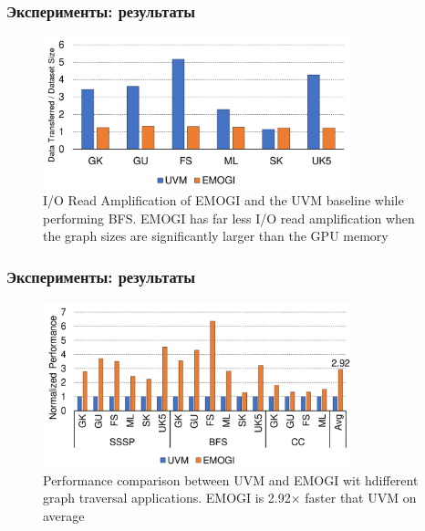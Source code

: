 \documentclass[xcolor=table,english]{beamer}
\begin{document}
\begin{frame}[fragile] \frametitle{Эксперименты: результаты}
     \begin{center}
    \begin{minipage}[m]{0.95\linewidth}
        \begin{figure}
            \centering
            \includegraphics[width=0.8\textwidth]{figures/transfered_data.png}
            \caption{I/O Read Amplification of EMOGI and the UVM baseline while performing BFS. EMOGI has far less I/O read amplification when the graph sizes are significantly larger than the GPU memory}
        \end{figure}
    \end{minipage}\hfill
    \end{center}
\end{frame}

\begin{frame}[fragile] \frametitle{Эксперименты: результаты}
     \begin{center}
    \begin{minipage}[m]{0.95\linewidth}
        \begin{figure}
            \centering
            \includegraphics[width=0.8\textwidth]{figures/overall_performance.png}
            \caption{Performance comparison between UVM and EMOGI wit hdifferent graph traversal applications. EMOGI is 2.92× faster that UVM on average}
        \end{figure}
    \end{minipage}\hfill
    \end{center}
\end{frame}
\end{document}
